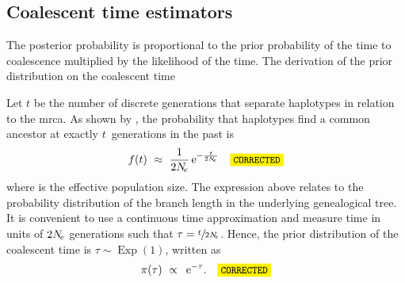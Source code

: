 

%
\subsection{Coalescent time estimators}\label{sec:tmrca_clocks}
%


%
%
%
%


The posterior probability is proportional to the prior probability of the time to coalescence multiplied by the likelihood of the time.
The derivation of the prior distribution on the coalescent time 

Let $t$ be the number of discrete generations that separate  haplotypes in relation to the \gls{mrca}.
As shown by \citet{Tajima:1983bt}, the probability that  haplotypes find a common ancestor at exactly $t$~generations in the past is
\begin{equation}
	f(t) ~\approx~ \frac{1}{2\Ne} \euler{-\frac{t}{2\Ne}} \CorrectLabel
\end{equation}
where \Ne is the effective population size.
The expression above relates to the probability distribution of the branch length in the underlying genealogical tree.
It is convenient to use a continuous time approximation and measure time in units of ${2N_{\!e}}$ generations such that ${\tau = \sfrac{t}{2N_{\!e}}}$.
Hence, the prior distribution of the coalescent time is ${\tau\sim\operatorname{Exp}(1)}$, written as
\begin{equation}
	\pi(\tau) ~\propto~ \euler{-\tau}\text{.}\CorrectLabel
\end{equation}


